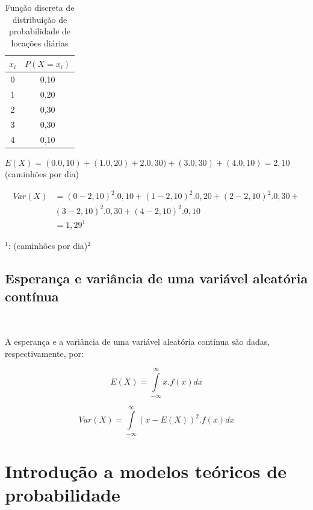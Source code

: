\documentclass[
]{book}
\begin{document}
\hfill\break

\begin{table}[htbp]
\centering
\caption*{Função discreta de distribuição de probabilidade de locações diárias}
\begin{tabular}{|c|c|}
\hline
$x_{i}$  & $P(X=x_{i})$  \\
\hline
0 & 0,10 \\
\hline
1 & 0,20 \\
\hline
2 & 0,30 \\
\hline
3 & 0,30 \\
\hline
4 & 0,10 \\
\hline
\end{tabular}
\end{table}

\hfill\break

\(E(X) = (0 . 0,10) + (1 . 0,20) + 2 . 0,30) + (3 . 0,30) + (4 . 0,10) = 2,10\) (caminhões por dia)

\hfill\break

\begin{align*}
Var(X) & = (0-2,10)^{2}.0,10 + (1-2,10)^{2}.0,20 + (2-2,10)^{2}.0,30 + \\
       & (3-2,10)^{2}.0,30 + (4-2,10)^{2}.0,10 \\
       & = 1,29^{1}
\end{align*}

\(^{1}\): (caminhões por dia)\(^{2}\)

\hypertarget{esperanuxe7a-e-variuxe2ncia-de-uma-variuxe1vel-aleatuxf3ria-contuxednua}{%
\section{Esperança e variância de uma variável aleatória contínua}\label{esperanuxe7a-e-variuxe2ncia-de-uma-variuxe1vel-aleatuxf3ria-contuxednua}}

~

A esperança e a variância de uma variável aleatória contínua são dadas, respectivamente, por:

\hfill\break

\[
E(X) = \underset{-\infty }{\overset{\infty }{\int }}x.f\left(x\right)dx
\]

\hfill\break

\[
Var(X) = \underset{-\infty }{\overset{\infty }{\int }} (x-E(X))^{2}.f\left(x\right)dx
\]

\hypertarget{introduuxe7uxe3o-a-modelos-teuxf3ricos-de-probabilidade}{%
\chapter{Introdução a modelos teóricos de probabilidade}\label{introduuxe7uxe3o-a-modelos-teuxf3ricos-de-probabilidade}}
\end{document}
